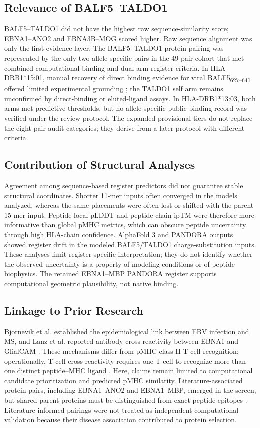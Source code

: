 \documentclass[11pt]{article}
\newcommand{\pep}[2]{#1\textsubscript{#2}}
\begin{document}
\subsection{Relevance of BALF5--TALDO1}
BALF5--TALDO1 did not have the highest raw sequence-similarity score; EBNA1--ANO2 and EBNA3B--MOG scored higher. Raw sequence alignment was only the first evidence layer. The BALF5--TALDO1 protein pairing was represented by the only two allele-specific pairs in the 49-pair cohort that met combined computational binding and dual-arm register criteria. In HLA-DRB1*15:01, manual recovery of direct binding evidence for viral \pep{BALF5}{627--641} offered limited experimental grounding \cite{iedb,hansen}; the TALDO1 self arm remains unconfirmed by direct-binding or eluted-ligand assays. In HLA-DRB1*13:03, both arms met predictive thresholds, but no allele-specific public binding record was verified under the review protocol. The expanded provisional tiers do not replace the eight-pair audit categories; they derive from a later protocol with different criteria.

\subsection{Contribution of Structural Analyses}
Agreement among sequence-based register predictors did not guarantee stable structural coordinates. Shorter 11-mer inputs often converged in the models analyzed, whereas the same placements were often lost or shifted with the parent 15-mer input. Peptide-local pLDDT and peptide-chain ipTM were therefore more informative than global pMHC metrics, which can obscure peptide uncertainty through high HLA-chain confidence. AlphaFold 3 and PANDORA outputs showed register drift in the modeled BALF5/TALDO1 charge-substitution inputs. These analyses limit register-specific interpretation; they do not identify whether the observed uncertainty is a property of modeling conditions or of peptide biophysics. The retained EBNA1--MBP PANDORA register supports computational geometric plausibility, not native binding.

\subsection{Linkage to Prior Research}
Bjornevik et al. established the epidemiological link between EBV infection and MS, and Lanz et al. reported antibody cross-reactivity between EBNA1 and GlialCAM \cite{bjornevik,lanz}. These mechanisms differ from pMHC class II T-cell recognition; operationally, T-cell cross-reactivity requires one T cell to recognize more than one distinct peptide--MHC ligand \cite{sewell}. Here, claims remain limited to computational candidate prioritization and predicted pMHC similarity. Literature-associated protein pairs, including EBNA1--ANO2 and EBNA1--MBP, emerged in the screen, but shared parent proteins must be distinguished from exact peptide epitopes \cite{thomas}. Literature-informed pairings were not treated as independent computational validation because their disease association contributed to protein selection.
\end{document}
